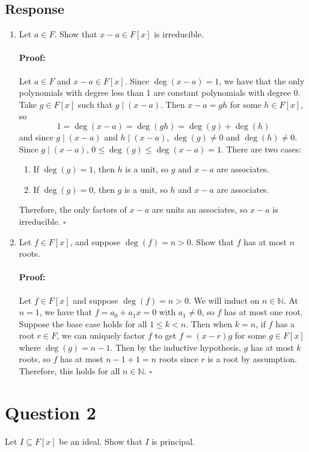 \documentclass [12pt] {article}
\newcommand{\N}{\mathbb{N}}
\newenvironment{proof}{\paragraph{Proof:}}{\hfill$\square$}
\begin{document}
\subsection*{Response}
\begin{enumerate}
    \item Let $a\in F$. Show that $x-a\in F[x]$ is irreducible.
        \begin{proof}
            Let $a \in F$ and $x - a \in F[x]$. Since $\deg(x - a) = 1$, we have that the only
            polynomials with degree less than 1 are constant polynomials with degree 0. Take
            $g \in F[x]$ such that $g \mid (x - a)$. Then $x - a = gh$ for some $h \in F[x]$, so
            \[
                1 = \deg(x - a) = \deg(gh) = \deg(g) + \deg(h)
            \]
            and since $g \mid (x - a)$ and $h \mid (x - a)$, $\deg(g) \neq 0$ and $\deg(h) \neq 0$.
            Since $g \mid (x - a)$, $0 \leq \deg(g) \leq \deg(x - a) = 1$. There are two cases:
            \begin{enumerate}
                \item If $\deg(g) = 1$, then $h$ is a unit, so $g$ and $x - a$ are associates.
                \item If $\deg(g) = 0$, then $g$ is a unit, so $h$ and $x - a$ are associates.
            \end{enumerate}
            Therefore, the only factors of $x - a$ are units an associates, so $x - a$ is
            irreducible.
        \end{proof}
    \item Let $f\in F[x]$, and suppose $\deg(f)=n>0$. Show that $f$ has at most $n$ roots.
        \begin{proof}
            Let $f \in F[x]$ and suppose $\deg(f) = n > 0$. We will induct on
            $n \in \N$. At $n = 1$, we have that $f = a_0 + a_1x = 0$ with $a_1 \neq 0$, so
            $f$ has at most one root. Suppose the base case holds for all $1 \leq k < n$. Then when
            $k = n$, if $f$ has a root $r \in F$, we can uniquely factor $f$ to get
            $f = (x - r)g$ for some $g \in F[x]$ where $\deg(g) = n - 1$. Then
            by the inductive hypothesis, $g$ has at most $k$ roots, so $f$ has at most
            $n - 1 + 1 = n$ roots since $r$ is a root by assumption. Therefore, this holds for all
            $n \in \N$.
        \end{proof}
\end{enumerate}
\newpage

\section*{Question 2}
Let $I\subseteq F[x]$ be an ideal. Show that $I$ is principal.
\end{document}

